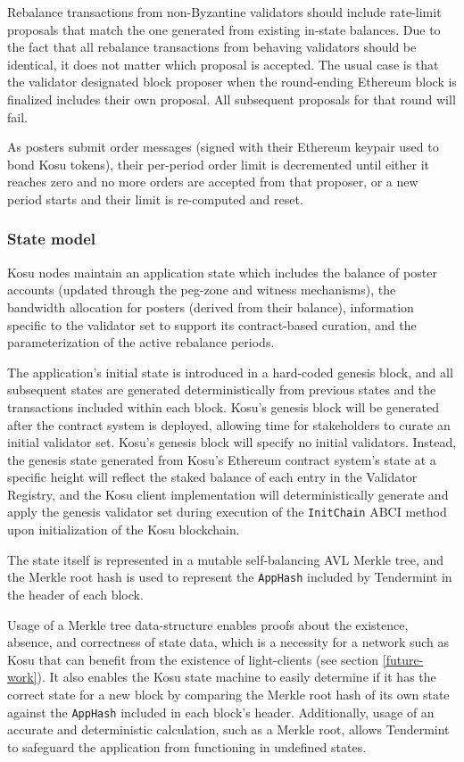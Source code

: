 \documentclass[10pt]{article}
\begin{document}
Rebalance transactions from non-Byzantine validators should include rate-limit proposals that match the one generated from existing in-state balances. Due to the fact that all rebalance transactions from behaving validators should be identical, it does not matter which proposal is accepted. The usual case is that the validator designated block proposer when the round-ending Ethereum block is finalized includes their own proposal. All subsequent proposals for that round will fail.
\medskip

As posters submit order messages (signed with their Ethereum keypair used to bond Kosu tokens), their per-period order limit is decremented until either it reaches zero and no more orders are accepted from that proposer, or a new period starts and their limit is re-computed and reset.
\subsubsection{State model}\label{tm-network-state}
Kosu nodes maintain an application state which includes the balance of poster accounts (updated through the peg-zone and witness mechanisms), the bandwidth allocation for posters (derived from their balance), information specific to the validator set to support its contract-based curation, and the parameterization of the active rebalance periods.
\medskip

The application's initial state is introduced in a hard-coded genesis block, and all subsequent states are generated deterministically from previous states and the transactions included within each block. Kosu’s genesis block will be generated after the contract system is deployed, allowing time for stakeholders to curate an initial validator set. Kosu’s genesis block will specify no initial validators. Instead, the genesis state generated from Kosu’s Ethereum contract system’s state at a specific height will reflect the staked balance of each entry in the Validator Registry, and the Kosu client implementation will deterministically generate and apply the genesis validator set during execution of the \texttt{InitChain} ABCI method upon initialization of the Kosu blockchain\cite{tendermint-abci-apps}.
\medskip

The state itself is represented in a mutable self-balancing AVL Merkle tree\cite{tendermint-iavl}, and the Merkle root hash is used to represent the \texttt{AppHash} included by Tendermint in the header of each block\cite{tendermint-abci-spec}.
\medskip

Usage of a Merkle tree data-structure enables proofs about the existence, absence, and correctness of state data, which is a necessity for a network such as Kosu that can benefit from the existence of light-clients (see section \ref{future-work}). It also enables the Kosu state machine to easily determine if it has the correct state for a new block by comparing the Merkle root hash of its own state against the \texttt{AppHash} included in each block’s header. Additionally, usage of an accurate and deterministic calculation, such as a Merkle root, allows Tendermint to safeguard the application from functioning in undefined states\cite{tendermint-abci-apps}. 
\medskip
\end{document}
